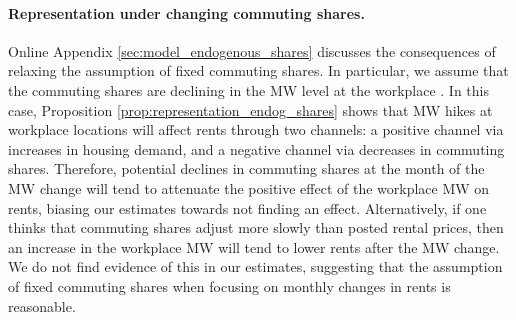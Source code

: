 \paragraph{Representation under changing commuting shares.} 

Online Appendix \ref{sec:model_endogenous_shares} discusses the consequences
of relaxing the assumption of fixed commuting shares.
In particular, we assume that the commuting shares are declining in the MW level
at the workplace \parencite[as found by, e.g.,][]{PerezPerez2021}.
In this case, Proposition \ref{prop:representation_endog_shares} shows that MW
hikes at workplace locations will affect rents through two channels:
a positive channel via increases in housing demand, and
a negative channel via decreases in commuting shares.
Therefore, potential declines in commuting shares at the month of the MW change 
will tend to attenuate the positive effect of the workplace MW on rents, biasing 
our estimates towards not finding an effect.
Alternatively, if one thinks that commuting shares adjust more slowly than
posted rental prices, then an increase in the workplace MW will tend to
lower rents after the MW change.
We do not find evidence of this in our estimates, suggesting that the assumption
of fixed commuting shares when focusing on monthly changes in rents is
reasonable.
